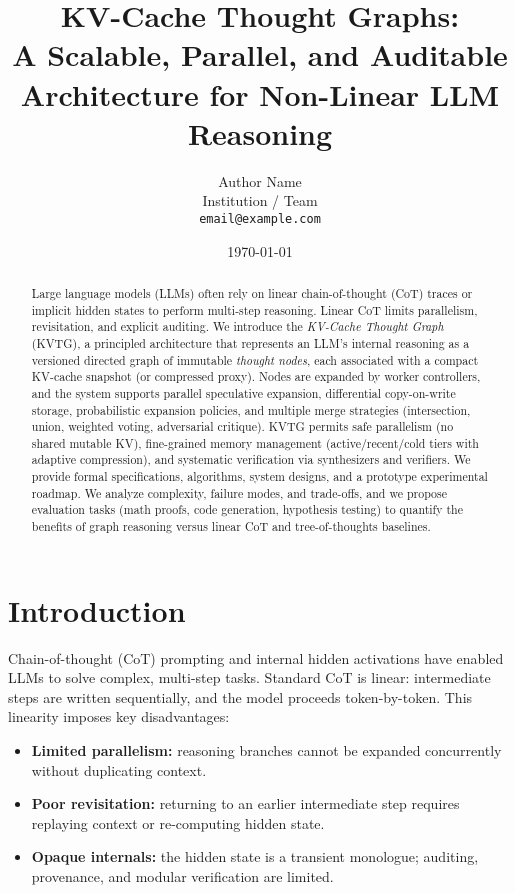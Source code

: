 \documentclass[11pt,onecolumn,letterpaper]{article}
\title{\Large \bf KV-Cache Thought Graphs:\\
A Scalable, Parallel, and Auditable Architecture for Non-Linear LLM Reasoning}
\author{Author Name \\
Institution / Team \\
\texttt{email@example.com}
}
\date{\today}
\begin{document}
\maketitle

\begin{abstract}
Large language models (LLMs) often rely on linear chain-of-thought (CoT) traces or implicit hidden states to perform multi-step reasoning. Linear CoT limits parallelism, revisitation, and explicit auditing. We introduce the \emph{KV-Cache Thought Graph} (KVTG), a principled architecture that represents an LLM's internal reasoning as a versioned directed graph of immutable \emph{thought nodes}, each associated with a compact KV-cache snapshot (or compressed proxy). Nodes are expanded by worker controllers, and the system supports parallel speculative expansion, differential copy-on-write storage, probabilistic expansion policies, and multiple merge strategies (intersection, union, weighted voting, adversarial critique). KVTG permits safe parallelism (no shared mutable KV), fine-grained memory management (active/recent/cold tiers with adaptive compression), and systematic verification via synthesizers and verifiers. We provide formal specifications, algorithms, system designs, and a prototype experimental roadmap. We analyze complexity, failure modes, and trade-offs, and we propose evaluation tasks (math proofs, code generation, hypothesis testing) to quantify the benefits of graph reasoning versus linear CoT and tree-of-thoughts baselines.
\end{abstract}

\section{Introduction}
Chain-of-thought (CoT) prompting and internal hidden activations have enabled LLMs to solve complex, multi-step tasks. Standard CoT is linear: intermediate steps are written sequentially, and the model proceeds token-by-token. This linearity imposes key disadvantages:
\begin{itemize}[nosep]
  \item \textbf{Limited parallelism:} reasoning branches cannot be expanded concurrently without duplicating context.
  \item \textbf{Poor revisitation:} returning to an earlier intermediate step requires replaying context or re-computing hidden state.
  \item \textbf{Opaque internals:} the hidden state is a transient monologue; auditing, provenance, and modular verification are limited.
\end{itemize}
\end{document}
